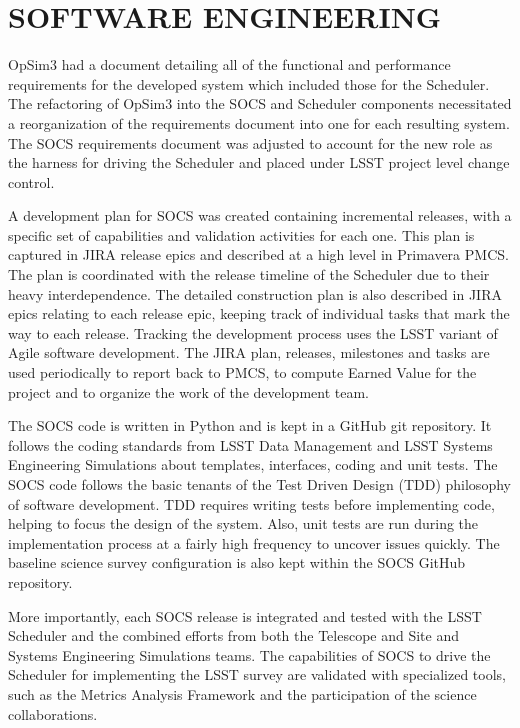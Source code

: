 \documentclass[]{spie}  %
\begin{document}
\section{SOFTWARE ENGINEERING}

OpSim3 had a document detailing all of the functional and performance requirements for the developed system which included those for the Scheduler. The refactoring of OpSim3 into the SOCS and Scheduler components necessitated a reorganization of the requirements document into one for each resulting system. The SOCS requirements document was adjusted to account for the new role as the harness for driving the Scheduler and placed under LSST project level change control.

A development plan for SOCS was created containing incremental releases, with a specific set of capabilities and validation activities for each one. This plan is captured in JIRA\cite{JIRA} release epics and described at a high level in Primavera\cite{Primavera} PMCS\cite{PMCS}. The plan is coordinated with the release timeline of the Scheduler due to their heavy interdependence. The detailed construction plan is also described in JIRA epics relating to each release epic, keeping track of individual tasks that mark the way to each release. Tracking the development process uses the LSST variant of Agile software development\cite{Kantor_SPIE2016}. The JIRA plan, releases, milestones and tasks are used periodically to report back to PMCS, to compute Earned Value for the project and to organize the work of the development team.

The SOCS code is written in Python\cite{Python} and is kept in a GitHub\cite{GitHub} git repository. It follows the coding standards\cite{DMPythonStyle} from LSST Data Management and LSST Systems Engineering Simulations about templates, interfaces, coding and unit tests. The SOCS code follows the basic tenants of the Test Driven Design\cite{Beck2002}\cite{Astels2003} (TDD) philosophy of software development. TDD requires writing tests before implementing code, helping to focus the design of the system. Also, unit tests are run during the implementation process at a fairly high frequency to uncover issues quickly. The baseline science survey configuration is also kept within the SOCS GitHub repository. 

More importantly, each SOCS release is integrated and tested with the LSST Scheduler and the combined efforts from both the Telescope and Site and Systems Engineering Simulations teams. The capabilities of SOCS to drive the Scheduler for implementing the LSST survey are validated with specialized tools, such as the Metrics Analysis Framework\cite{2014SPIE.9149E..0BJ} and the participation of the science collaborations.
\end{document}
